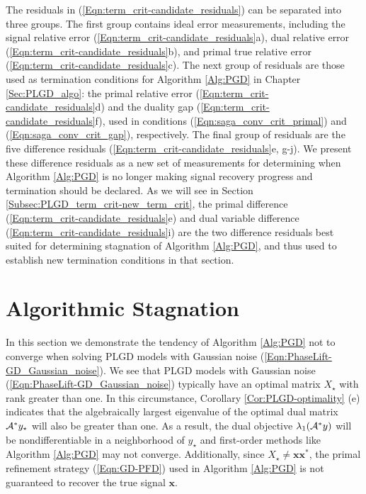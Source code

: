 The residuals in (\ref{Eqn:term_crit-candidate_residuals}) can be separated into three groups.   
The first group contains ideal error measurements, including the signal relative error (\ref{Eqn:term_crit-candidate_residuals}a), dual relative error (\ref{Eqn:term_crit-candidate_residuals}b), and primal true relative error (\ref{Eqn:term_crit-candidate_residuals}c).
The next group of residuals are those used as termination conditions for Algorithm \ref{Alg:PGD} in Chapter \ref{Sec:PLGD_algo}: the primal relative error (\ref{Eqn:term_crit-candidate_residuals}d) and the duality gap (\ref{Eqn:term_crit-candidate_residuals}f), used in conditions (\ref{Eqn:saga_conv_crit_primal}) and (\ref{Eqn:saga_conv_crit_gap}), respectively.
The final group of residuals are the five difference residuals (\ref{Eqn:term_crit-candidate_residuals}e, g-j).
We present these difference residuals as a new set of measurements for determining when Algorithm \ref{Alg:PGD} is no longer making signal recovery progress and termination should be declared.
As we will see in Section \ref{Subsec:PLGD_term_crit-new_term_crit}, the primal difference (\ref{Eqn:term_crit-candidate_residuals}e) and dual variable difference (\ref{Eqn:term_crit-candidate_residuals}i) are the two difference residuals best suited for determining stagnation of Algorithm \ref{Alg:PGD}, and thus used to establish new termination conditions in that section.









\section{Algorithmic Stagnation} 		\label{Subsec:PLGD_term_crit-stagnation}





In this section we demonstrate the tendency of Algorithm \ref{Alg:PGD} not to converge when solving PLGD models with Gaussian noise (\ref{Eqn:PhaseLift-GD_Gaussian_noise}).  
We see that PLGD models with Gaussian noise (\ref{Eqn:PhaseLift-GD_Gaussian_noise}) typically have an optimal matrix $X_\star$ with rank greater than one.  
In this circumstance, Corollary \ref{Cor:PLGD-optimality} (e) indicates that the algebraically largest eigenvalue of the optimal dual matrix ${\mathcal A}^*y_\star$ will also be greater than one.
As a result, the dual objective $\lambda_1({\mathcal A}^*y)$ will be nondifferentiable in a neighborhood of $y_\star$ and first-order methods like Algorithm \ref{Alg:PGD} may not converge.
Additionally, since $X_\star \neq \mathbf{x}\mathbf{x}^*$, the primal refinement strategy (\ref{Eqn:GD-PFD}) used in Algorithm \ref{Alg:PGD} is not guaranteed to recover the true signal $\mathbf{x}$.


